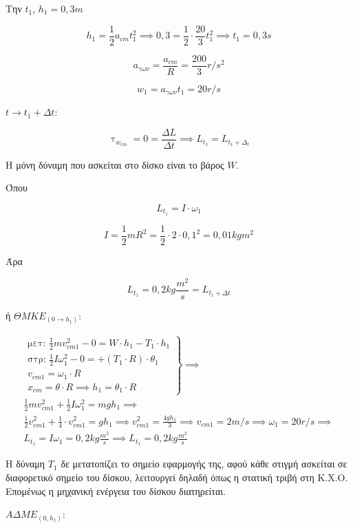 \documentclass[12pt]{article}
\begin{document}
\begin{enumerate}
    Την $t_1$, $h_1=0,3m$

    $$h_1=\frac{1}{2}a_{cm}t_1^2\implies 0,3=\frac{1}{2}\cdot\frac{20}{3}t_1^2\implies t_1=0,3s$$

    $$a_{γων}=\frac{a_{cm}}{R}=\frac{200}{3}r/s^2$$

    $$w_1=a_{γων}t_1=20r/s$$

    $t \to t_1+Δt$:

    $$\uptau_{w_{cm}}=0=\frac{ΔL}{Δt}\implies L_{t_1}=L_{t_1+Δ_t}$$

    Η μόνη δύναμη που ασκείται στο δίσκο είναι το βάρος $W$.

    Όπου

    $$L_{t_1}=I\cdot ω_1$$

    $$I=\frac{1}{2}mR^2=\frac{1}{2}\cdot 2 \cdot 0,1^2=0,01kg m^2$$

    Άρα

    $$L_{t_1}=0,2kg\frac{m^2}{s}=L_{t_1+Δt}$$

    ή $ΘΜΚΕ_{(0\to h_1)}:$

    \begin{gather*}
      \left. \begin{matrix}\text{μετ: }\frac{1}{2}mv_{cm1}^2-0=W\cdot h_1-T_1\cdot h_1 \\ \text{στρ: } \frac{1}{2}Iω_1^2-0=+(T_1\cdot R)\cdot θ_1 \\ v_{cm1}=ω_1\cdot R \\ x_{cm}=θ\cdot R\implies h_1=θ_1\cdot R \end{matrix} \right\}\implies \\      \frac{1}{2}mv_{cm1}^2+\frac{1}{2}Iω_1^2=mgh_1\implies  \\
      \frac{1}{2}v_{cm1}^2+\frac{1}{4}\cdot v_{cm1}^2=gh_1 \implies v_{cm1}^2=\frac{4gh_1}{3}\implies v_{cm1}=2m/s \implies ω_1=20r/s \implies \\
       L_{t_1}=Iω_1=0,2kg \frac{m^2}{s}\implies L_{t_1}=0,2 kg \frac{m^2}{s}
    \end{gather*}

    Η δύναμη $T_1$ δε μετατοπίζει το σημείο εφαρμογής της, αφού κάθε στιγμή ασκείται σε διαφορετικό σημείο του δίσκου, λειτουργεί δηλαδή όπως η στατική τριβή στη Κ.Χ.Ο. Επομένως η μηχανική ενέργεια του δίσκου διατηρείται.

    $ΑΔΜΕ_{(0,h_1)}:$


\end{enumerate}
\end{document}
